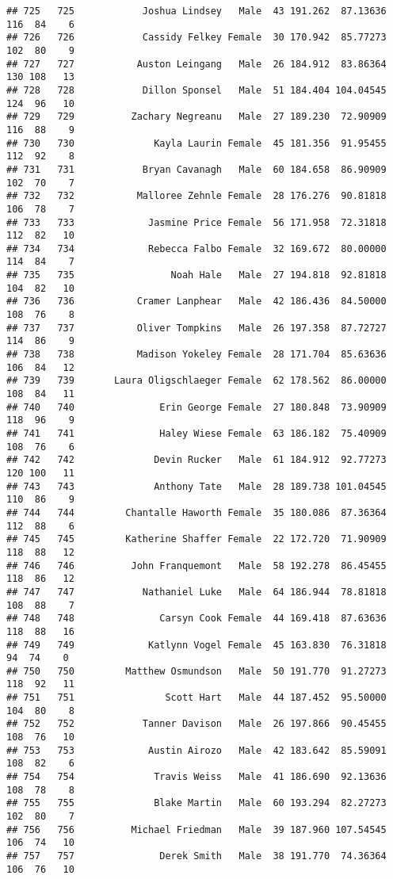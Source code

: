 \documentclass[
]{article}
\begin{document}
\begin{verbatim}
## 725   725            Joshua Lindsey   Male  43 191.262  87.13636 116  84    6
## 726   726            Cassidy Felkey Female  30 170.942  85.77273 102  80    9
## 727   727           Auston Leingang   Male  26 184.912  83.86364 130 108   13
## 728   728            Dillon Sponsel   Male  51 184.404 104.04545 124  96   10
## 729   729          Zachary Negreanu   Male  27 189.230  72.90909 116  88    9
## 730   730              Kayla Laurin Female  45 181.356  91.95455 112  92    8
## 731   731            Bryan Cavanagh   Male  60 184.658  86.90909 102  70    7
## 732   732           Malloree Zehnle Female  28 176.276  90.81818 106  78    7
## 733   733             Jasmine Price Female  56 171.958  72.31818 112  82   10
## 734   734             Rebecca Falbo Female  32 169.672  80.00000 114  84    7
## 735   735                 Noah Hale   Male  27 194.818  92.81818 104  82   10
## 736   736           Cramer Lanphear   Male  42 186.436  84.50000 108  76    8
## 737   737           Oliver Tompkins   Male  26 197.358  87.72727 114  86    9
## 738   738           Madison Yokeley Female  28 171.704  85.63636 106  84   12
## 739   739       Laura Oligschlaeger Female  62 178.562  86.00000 108  84   11
## 740   740               Erin George Female  27 180.848  73.90909 118  96    9
## 741   741               Haley Wiese Female  63 186.182  75.40909 108  76    6
## 742   742              Devin Rucker   Male  61 184.912  92.77273 120 100   11
## 743   743              Anthony Tate   Male  28 189.738 101.04545 110  86    9
## 744   744         Chantalle Haworth Female  35 180.086  87.36364 112  88    6
## 745   745         Katherine Shaffer Female  22 172.720  71.90909 118  88   12
## 746   746          John Franquemont   Male  58 192.278  86.45455 118  86   12
## 747   747            Nathaniel Luke   Male  64 186.944  78.81818 108  88    7
## 748   748               Carsyn Cook Female  44 169.418  87.63636 118  88   16
## 749   749             Katlynn Vogel Female  45 163.830  76.31818  94  74    0
## 750   750         Matthew Osmundson   Male  50 191.770  91.27273 118  92   11
## 751   751                Scott Hart   Male  44 187.452  95.50000 104  80    8
## 752   752            Tanner Davison   Male  26 197.866  90.45455 108  76   10
## 753   753             Austin Airozo   Male  42 183.642  85.59091 108  82    6
## 754   754              Travis Weiss   Male  41 186.690  92.13636 108  78    8
## 755   755              Blake Martin   Male  60 193.294  82.27273 102  80    7
## 756   756          Michael Friedman   Male  39 187.960 107.54545 106  74   10
## 757   757               Derek Smith   Male  38 191.770  74.36364 106  76   10

\end{verbatim}
\end{document}
